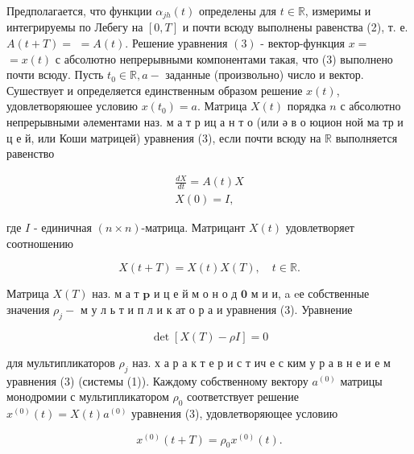 \documentclass[10pt]{article}
\begin{document}
Предполагается, что функции $\alpha_{j h}(t)$ определены для $t \in \mathbb{R}$, измеримы и интегрируемы по Лебегу на $[0, T]$ и почти всюду выполнены равенства (2), т. е. $A(t+T)=$ $=A(t)$. Решение уравнения $(3)$ - вектор-функция $x=$ $=x(t)$ с абсолютно непрерывными компонентами такая, что (3) выполнено почти всюду. Пусть $t_{0} \in \mathbb{R}, a-$ заданные (произвольно) число и вектор. Сушествует и определяется единственным образом решение $x(t)$, удовлетворяюшее условию $x\left(t_{0}\right)=a$. Матрица $X(t)$ порядка $n$ с абсолютно непрерывными әлементами наз. м а т р иц а н т о (или ә в о юцион ной ма тр и ц е й, или Коши матрицей) уравнения (3), если почти всюду на $\mathbb{R}$ выполняется равенство



\[

\begin{gathered}

\frac{d X}{d t}=A(t) X \\

X(0)=I,

\end{gathered}

\]



где $I$ - единичная $(n \times n)$-матрица. Матрицант $X(t)$ удовлетворяет соотношению



\[

X(t+T)=X(t) X(T), \quad t \in \mathbb{R} .

\]



Матрица $X(T)$ наз. м а т $\mathbf{p}$ и ц е й м о н о д $\mathbf{0}$ м и и, a eе собственные значения $\rho_{j}-$ м у л ь т и п л и к ат о р а и уравнения (3). Уравнение



\[

\operatorname{det}[X(T)-\rho I]=0

\]



для мультипликаторов $\rho_{j}$ наз. х а р а к т е р и с т ич е с ким у р а в н е и е м уравнения (3) (системы (1)). Каждому собственному вектору $a^{(0)}$ матрицы монодромии с мультипликатором $\rho_{0}$ соответствует решение $x^{(0)}(t)=X(t) a^{(0)}$ уравнения (3), удовлетворяющее условию



\[

x^{(0)}(t+T)=\rho_{0} x^{(0)}(t) .

\]
\end{document}
